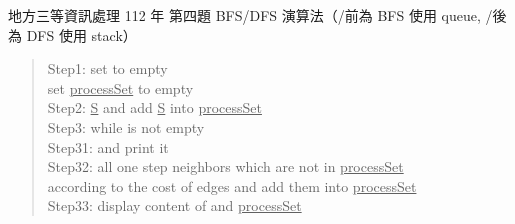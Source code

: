 \begin{pastexam}[label={px:df3-112-ds-04}]{地方三等資訊處理 112 年 第四題}
BFS/DFS 演算法（/前為 BFS 使用 queue, /後為 DFS 使用 stack）
\begin{quote}
Step1: set  to empty\\
\hspace*{3.2em}set \underline{processSet} to empty\\
Step2:  \underline{S} and add \underline{S} into \underline{processSet}\\
Step3: while  is not empty\\
Step31:  and print it\\
Step32:  all one step neighbors which are not in \underline{processSet}\\
\hspace*{3.6em}according to the cost of edges and add them into \underline{processSet}\\
Step33: display content of  and \underline{processSet}
\end{quote}
\end{pastexam}

